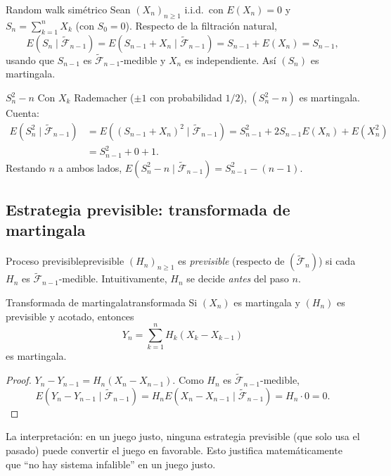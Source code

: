 \documentclass[11pt, a4paper]{article}
\begin{document}
\begin{ejemplo}{Random walk simétrico}{}
Sean $(X_n)_{n \ge 1}$ i.i.d.\ con $E(X_n) = 0$ y $S_n = \sum_{k=1}^n X_k$ (con $S_0 = 0$).
Respecto de la filtración natural,
$$ E(S_n \mid \widetilde{\mathcal{F}}_{n-1}) = E(S_{n-1} + X_n \mid \widetilde{\mathcal{F}}_{n-1})
= S_{n-1} + E(X_n) = S_{n-1}, $$
usando que $S_{n-1}$ es $\widetilde{\mathcal{F}}_{n-1}$-medible y $X_n$ es independiente. Así
$(S_n)$ es martingala.
\end{ejemplo}

\begin{ejemplo}{$S_n^2 - n$}{}
Con $X_k$ Rademacher ($\pm 1$ con probabilidad $1/2$), $(S_n^2 - n)$ es martingala. Cuenta:
\begin{align*}
E(S_n^2 \mid \widetilde{\mathcal{F}}_{n-1}) &= E((S_{n-1} + X_n)^2 \mid
\widetilde{\mathcal{F}}_{n-1})
= S_{n-1}^2 + 2 S_{n-1} E(X_n) + E(X_n^2) \\
&= S_{n-1}^2 + 0 + 1.
\end{align*}
Restando $n$ a ambos lados, $E(S_n^2 - n \mid \widetilde{\mathcal{F}}_{n-1}) = S_{n-1}^2 - (n-1)$.
\end{ejemplo}

\subsection{Estrategia previsible: transformada de martingala}

\begin{definicion}{Proceso previsible}{previsible}
$(H_n)_{n \ge 1}$ es \emph{previsible} (respecto de $(\widetilde{\mathcal{F}}_n)$) si cada $H_n$ es
$\widetilde{\mathcal{F}}_{n-1}$-medible. Intuitivamente, $H_n$ se decide \emph{antes} del paso $n$.
\end{definicion}

\begin{proposicion}{Transformada de martingala}{transformada}
Si $(X_n)$ es martingala y $(H_n)$ es previsible y acotado, entonces
$$ Y_n = \sum_{k=1}^n H_k (X_k - X_{k-1}) $$
es martingala.
\end{proposicion}

\begin{proof}
$Y_n - Y_{n-1} = H_n (X_n - X_{n-1})$. Como $H_n$ es $\widetilde{\mathcal{F}}_{n-1}$-medible,
$$ E(Y_n - Y_{n-1} \mid \widetilde{\mathcal{F}}_{n-1}) = H_n E(X_n - X_{n-1} \mid
\widetilde{\mathcal{F}}_{n-1}) = H_n \cdot 0 = 0. $$
\end{proof}

\obs La interpretación: en un juego justo, ninguna estrategia previsible (que solo usa el
pasado) puede convertir el juego en favorable. Esto justifica matemáticamente que ``no hay
sistema infalible'' en un juego justo.
\end{document}
